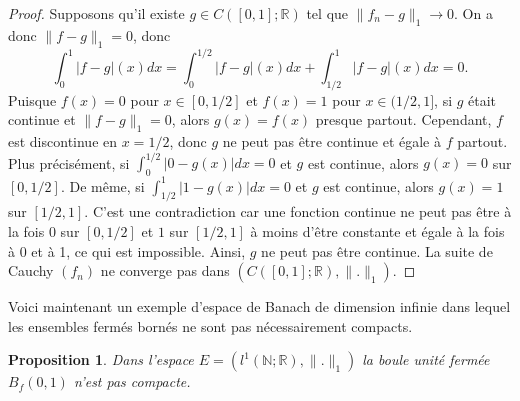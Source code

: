\documentclass{article}
\newtheorem{proposition}[theorem]{Proposition}
\begin{document}
\begin{proof}
Supposons qu'il existe $g \in C([0, 1]; \mathbb{R})$ tel que $\|f_n - g\|_1 \rightarrow 0$. On a donc $\|f - g\|_1 = 0$, donc
\begin{equation}
    \int_0^1 |f - g|(x) dx = \int_{0}^{1/2} |f - g|(x) dx + \int_{1/2}^{1} |f - g|(x) dx = 0.
\end{equation}
Puisque $f(x) = 0$ pour $x \in [0, 1/2]$ et $f(x) = 1$ pour $x \in (1/2, 1]$, si $g$ était continue et $\|f-g\|_1 = 0$, alors $g(x) = f(x)$ presque partout. Cependant, $f$ est discontinue en $x=1/2$, donc $g$ ne peut pas être continue et égale à $f$ partout. Plus précisément, si $\int_0^{1/2} |0 - g(x)| dx = 0$ et $g$ est continue, alors $g(x) = 0$ sur $[0, 1/2]$. De même, si $\int_{1/2}^{1} |1 - g(x)| dx = 0$ et $g$ est continue, alors $g(x) = 1$ sur $[1/2, 1]$. C'est une contradiction car une fonction continue ne peut pas être à la fois $0$ sur $[0, 1/2]$ et $1$ sur $[1/2, 1]$ à moins d'être constante et égale à la fois à 0 et à 1, ce qui est impossible. Ainsi, $g$ ne peut pas être continue.
La suite de Cauchy $(f_n)$ ne converge pas dans $(C([0, 1]; \mathbb{R}), \|.\|_1)$.
\end{proof}

Voici maintenant un exemple d'espace de Banach de dimension infinie dans lequel les ensembles fermés bornés ne sont pas nécessairement compacts.

\begin{proposition}
\label{prop:unit_ball_not_compact}
Dans l'espace $E = (l^1(\mathbb{N}; \mathbb{R}), \|.\|_1)$ la boule unité fermée $B_f(0, 1)$ n'est pas compacte.
\end{proposition}
\end{document}
